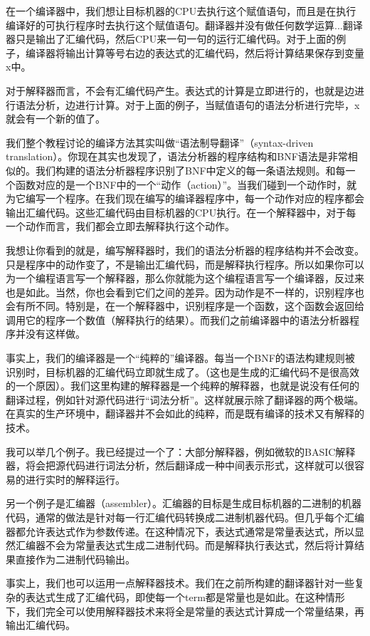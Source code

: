 在一个编译器中，我们想让目标机器的CPU去执行这个赋值语句，而且是在执行编译好的可执行程序时去执行这个赋值语句。翻译器并没有做任何数学运算...翻译器只是输出了汇编代码，然后CPU来一句一句的运行汇编代码。对于上面的例子，编译器将输出计算等号右边的表达式的汇编代码，然后将计算结果保存到变量x中。

对于解释器而言，不会有汇编代码产生。表达式的计算是立即进行的，也就是边进行语法分析，边进行计算。对于上面的例子，当赋值语句的语法分析进行完毕，x就会有一个新的值了。

我们整个教程讨论的编译方法其实叫做“语法制导翻译”（syntax-driven translation）。你现在其实也发现了，语法分析器的程序结构和BNF语法是非常相似的。我们构建的语法分析器程序识别了BNF中定义的每一条语法规则。和每一个函数对应的是一个BNF中的一个“动作（action）”。当我们碰到一个动作时，就为它编写一个程序。在我们现在编写的编译器程序中，每一个动作对应的程序都会输出汇编代码。这些汇编代码由目标机器的CPU执行。在一个解释器中，对于每一个动作而言，我们都会立即去解释执行这个动作。

我想让你看到的就是，编写解释器时，我们的语法分析器的程序结构并不会改变。只是程序中的动作变了，不是输出汇编代码，而是解释执行程序。所以如果你可以为一个编程语言写一个解释器，那么你就能为这个编程语言写一个编译器，反过来也是如此。当然，你也会看到它们之间的差异。因为动作是不一样的，识别程序也会有所不同。特别是，在一个解释器中，识别程序是一个函数，这个函数会返回给调用它的程序一个数值（解释执行的结果）。而我们之前编译器中的语法分析器程序并没有这样做。

事实上，我们的编译器是一个“纯粹的”编译器。每当一个BNF的语法构建规则被识别时，目标机器的汇编代码立即就生成了。（这也是生成的汇编代码不是很高效的一个原因）。我们这里构建的解释器是一个纯粹的解释器，也就是说没有任何的翻译过程，例如针对源代码进行“词法分析”。这样就展示除了翻译器的两个极端。在真实的生产环境中，翻译器并不会如此的纯粹，而是既有编译的技术又有解释的技术。

我可以举几个例子。我已经提过一个了：大部分解释器，例如微软的BASIC解释器，将会把源代码进行词法分析，然后翻译成一种中间表示形式，这样就可以很容易的进行实时的解释运行。

另一个例子是汇编器（assembler）。汇编器的目标是生成目标机器的二进制的机器代码，通常的做法是针对每一行汇编代码转换成二进制机器代码。但几乎每个汇编器都允许表达式作为参数传递。在这种情况下，表达式通常是常量表达式，所以显然汇编器不会为常量表达式生成二进制代码。而是解释执行表达式，然后将计算结果直接作为二进制代码输出。

事实上，我们也可以运用一点解释器技术。我们在之前所构建的翻译器针对一些复杂的表达式生成了汇编代码，即使每一个term都是常量也是如此。在这种情形下，我们完全可以使用解释器技术来将全是常量的表达式计算成一个常量结果，再输出汇编代码。

